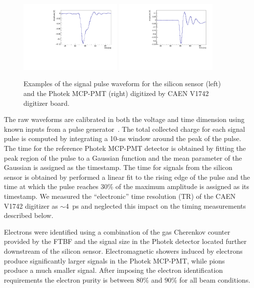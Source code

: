 \documentclass[12pt]{article}
\begin{document}
\begin{figure}[htbp] 
\centering
\includegraphics[width=0.45\textwidth]{plots/ExampleSiliconPadPulse_6X0_16GeV.pdf} 
\includegraphics[width=0.45\textwidth]{plots/ExamplePhotekPulse.pdf} 
\caption{Examples of the signal pulse waveform for the silicon sensor (left) and the Photek MCP-PMT (right) digitized by CAEN V1742 digitizer board.} 
\label{fig:pulses} 
\end{figure} 

The raw waveforms are calibrated in both the voltage and time dimension using
known inputs from a pulse generator~\cite{Kim201467}. The total collected charge for each
signal pulse is computed by integrating a 10-ns window around the peak of the
pulse. The time for the reference Photek MCP-PMT detector is obtained by fitting
the peak region of the pulse to a Gaussian function and the mean parameter of
the Gaussian is assigned as the timestamp. The time for signals from the silicon
sensor is obtained by performed a linear fit to the rising edge of the pulse and
the time at which the pulse reaches 30\% of the maximum amplitude is assigned as
its timestamp. We measured the “electronic” time resolution (TR) of the CAEN
V1742 digitizer as $\sim$4~ps and neglected this impact on the timing measurements
described below.

Electrons were identified using a combination of the gas Cherenkov counter
provided by the FTBF and the signal size in the Photek detector located further
downstream of the silicon sensor. Electromagnetic showers induced by electrons
produce significantly larger signals in the Photek MCP-PMT, while pions produce
a much smaller signal. After imposing the electron identification 
requirements the electron purity is between $80\%$ and $90\%$ for all beam
conditions. 
\end{document}
